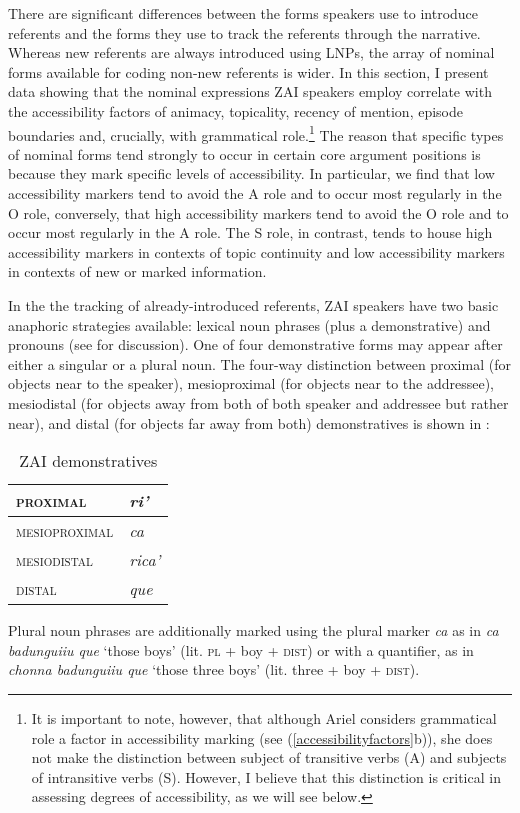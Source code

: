 There are significant differences between the forms speakers use to introduce referents and the forms they use to track the referents through the narrative. Whereas new referents are always introduced using LNPs, the array of nominal forms available for coding non-new referents is wider. In this section, I present data showing that the nominal expressions ZAI speakers employ correlate with the accessibility factors of animacy, topicality, recency of mention, episode boundaries and, crucially, with grammatical role.\footnote{It is important to note, however, that although Ariel considers grammatical role a factor in accessibility marking (see (\ref{accessibilityfactors}b)), she does not make the distinction between subject of transitive verbs (A) and subjects of intransitive verbs (S). However, I believe that this distinction is critical in assessing degrees of accessibility, as we will see below.} The reason that specific types of nominal forms tend strongly to occur in certain core argument positions is because they mark specific levels of accessibility. In particular, we find that low accessibility markers tend to avoid the A role and to occur most regularly in the O role, conversely, that high accessibility markers tend to avoid the O role and to occur most regularly in the A role. The S role, in contrast, tends to house high accessibility markers in contexts of topic continuity and low accessibility markers in contexts of new or marked information.


In the the tracking of already-introduced referents, ZAI speakers have two basic anaphoric strategies available: lexical noun phrases (plus a demonstrative) and pronouns (see  for discussion). One of four demonstrative forms may appear after either a singular or a plural noun. The four-way distinction between proximal (for objects near to the speaker), mesioproximal (for objects near to the addressee), mesiodistal (for objects away from both of both speaker and addressee but rather near), and distal (for objects far away from both) demonstratives is shown in : 
 
\begin{table}[H]  
\begin{center}
\caption{\small{ZAI demonstratives}}
\begin{tabular}{| l | l |}\hline
\textsc{proximal} & \textit{ri'} \\
\hline
\textsc{mesioproximal} & \textit{ca} \\
\hline
\textsc{mesiodistal} & \textit{rica'} \\
\hline
\textsc{distal} & \textit{que} \\
\hline
\end{tabular}
\label{zdmn}
\end{center}
\end{table}
Plural noun phrases are additionally marked using the plural marker \textit{ca} as in \textit{ca badunguiiu que} `those boys' (lit. \textsc{pl} + boy + \textsc{dist}) or with a quantifier, as in \textit{chonna badunguiiu que} `those three boys' (lit. three + boy + \textsc{dist}).

